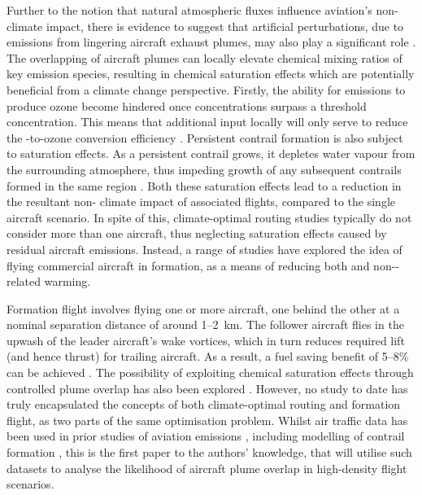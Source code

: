 Further to the notion that natural atmospheric fluxes influence aviation's non- climate impact, there is evidence to suggest that artificial perturbations, due to emissions from lingering aircraft exhaust plumes, may also play a significant role \cite{Schlager1997, Jaegle1999}. The overlapping of aircraft plumes can locally elevate chemical mixing ratios of key emission species, resulting in chemical saturation effects which are potentially beneficial from a climate change perspective. Firstly, the ability for  emissions to produce ozone become hindered once concentrations surpass a threshold concentration. This means that additional  input locally will only serve to reduce the -to-ozone conversion efficiency \cite{Jenkin2002}. Persistent contrail formation is also subject to saturation effects. As a persistent contrail grows, it depletes water vapour from the surrounding atmosphere, thus impeding growth of any subsequent contrails formed in the same region \cite{Unterstrasser2010}. Both these saturation effects lead to a reduction in the resultant non- climate impact of associated flights, compared to the single aircraft scenario. In spite of this, climate-optimal routing studies typically do not consider more than one aircraft, thus neglecting saturation effects caused by residual aircraft emissions. Instead, a range of studies have explored the idea of flying commercial aircraft in formation, as a means of reducing both  and non--related warming. 

Formation flight involves flying one or more aircraft, one behind the other at a nominal separation distance of around 1--2~km. The follower aircraft flies in the upwash of the leader aircraft's wake vortices, which in turn reduces required lift (and hence thrust) for trailing aircraft. As a result, a fuel saving benefit of 5--8\% can be achieved \cite{Xu2014, Bangash2004}. The possibility of exploiting chemical saturation effects through controlled plume overlap has also been explored \cite{Dahlmann2020, Marks2020}. However, no study to date has truly encapsulated the concepts of both climate-optimal routing and formation flight, as two parts of the same optimisation problem. Whilst air traffic data has been used in prior studies of aviation emissions \cite{Filippone2021, Sun2022}, including modelling of contrail formation \cite{Gruber2018}, this is the first paper to the authors' knowledge, that will utilise such datasets to analyse the likelihood of aircraft plume overlap in high-density flight scenarios.